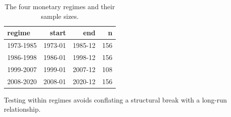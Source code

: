 \begin{table}[htbp]
\centering
\caption{The four monetary regimes and their sample sizes.}
\label{tab:tab02_regimes}
\begin{threeparttable}
\begin{tabular}{lrrr}
\toprule
regime & start & end & n \\
\midrule
1973-1985 & 1973-01 & 1985-12 & 156 \\
1986-1998 & 1986-01 & 1998-12 & 156 \\
1999-2007 & 1999-01 & 2007-12 & 108 \\
2008-2020 & 2008-01 & 2020-12 & 156 \\
\bottomrule
\end{tabular}

\begin{tablenotes}[flushleft]\small
\item Testing within regimes avoids conflating a structural break with a long-run relationship.
\end{tablenotes}
\end{threeparttable}
\end{table}
